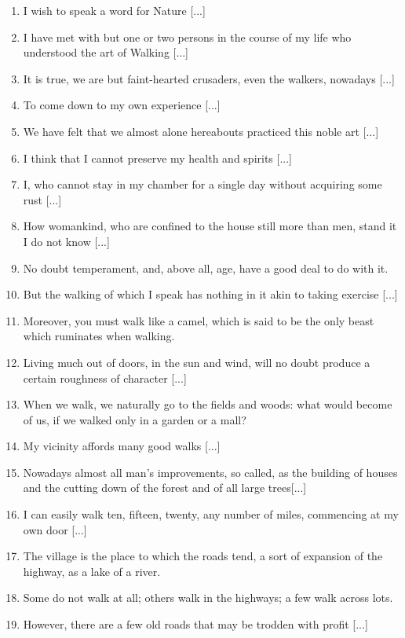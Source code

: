 \documentclass[twoside,openright,10pt]{memoir} %
\begin{document}
\setlength\parskip{0pt}
\begin{enumerate}
\item I wish to speak a word for Nature [...]
\item I have met with but one or two persons in the course of my life who understood the art of Walking [...]
\item It is true, we are but faint-hearted crusaders, even the walkers, nowadays [...]  
\item To come down to my own experience [...]  
\item We have felt that we almost alone hereabouts practiced this noble art [...]
\item I think that I cannot preserve my health and spirits [...]
\item I, who cannot stay in my chamber for a single day without acquiring some rust [...]
\item How womankind, who are confined to the house still more than men, stand it I do not know [...]
\item No doubt temperament, and, above all, age, have a good deal to do with it.  
\item But the walking of which I speak has nothing in it akin to taking exercise [...]
\item Moreover, you must walk like a camel, which is said to be the only beast which ruminates when walking.
\item Living much out of doors, in the sun and wind, will no doubt produce a certain roughness of character [...]
\item When we walk, we naturally go to the fields and woods: what would become of us, if we walked only in a garden or a mall?
\item My vicinity affords many good walks [...]
\item Nowadays almost all man’s improvements, so called, as the building of houses and the cutting down of the forest and of all large trees[...]
\item I can easily walk ten, fifteen, twenty, any number of miles, commencing at my own door [...]
\item The village is the place to which the roads tend, a sort of expansion of the highway, as a lake of a river.  
\item Some do not walk at all; others walk in the highways; a few walk across lots.  
\item However, there are a few old roads that may be trodden with profit [...]
  \begin{description}

\end{description}
\end{enumerate}
\end{document}
